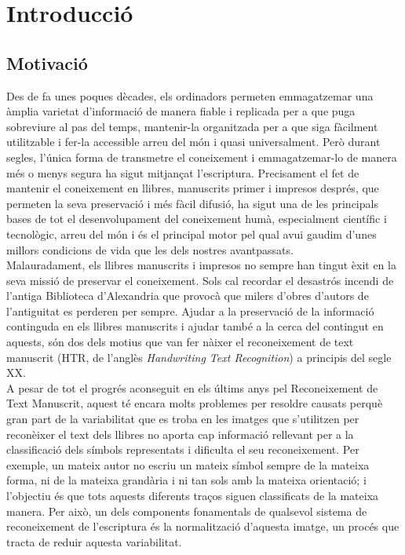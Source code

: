 \chapter{Introducció}
\label{cap:int}

\section{Motivació}
Des de fa unes poques dècades, els ordinadors permeten emmagatzemar una àmplia varietat d'informació de manera fiable i replicada per a que puga sobreviure al pas del temps, mantenir-la organitzada per a que siga fàcilment utilitzable i fer-la accessible arreu del món i quasi universalment. Però durant segles, l'única forma de transmetre el coneixement i emmagatzemar-lo de manera més o menys segura ha sigut mitjançat l'escriptura. Precisament el fet de mantenir el coneixement en llibres, manuscrits primer i impresos després, que permeten la seva preservació i més fàcil difusió, ha sigut una de les principals bases de tot el desenvolupament del coneixement humà, especialment científic i tecnològic, arreu del món i és el principal motor pel qual avui gaudim d'unes millors condicions de vida que les dels nostres avantpassats.\\

Malauradament, els llibres manuscrits i impresos no sempre han tingut èxit en la seva missió de preservar el coneixement. Sols cal recordar el desastrós incendi de l'antiga Biblioteca d'Alexandria que provocà que milers d'obres d'autors de l'antiguitat es perderen per sempre. Ajudar a la preservació de la informació continguda en els llibres manuscrits i ajudar també a la cerca del contingut en aquests, són dos dels motius que van fer nàixer el reconeixement de text manuscrit (HTR, de l'anglès \emph{Handwriting Text Recognition}) a principis del segle XX.\\

A pesar de tot el progrés aconseguit en els últims anys pel Reconeixement de Text Manuscrit, aquest té encara molts problemes per resoldre causats perquè gran part de la variabilitat que es troba en les imatges que s'utilitzen per reconèixer el text dels llibres no aporta cap informació rellevant per a la classificació dels símbols representats i dificulta el seu reconeixement. Per exemple, un mateix autor no escriu un mateix símbol sempre de la mateixa forma, ni de la mateixa grandària i ni tan sols amb la mateixa orientació; i l'objectiu és que tots aquests diferents traços siguen classificats de la mateixa manera. Per això, un dels components fonamentals de qualsevol sistema de reconeixement de l'escriptura és la normalització d'aquesta imatge, un procés que tracta de reduir aquesta variabilitat.\\

